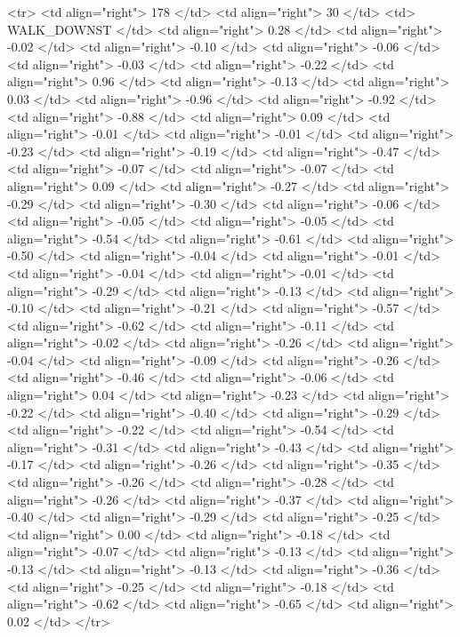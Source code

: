   <tr> <td align="right"> 178 </td> <td align="right">  30 </td> <td> WALK_DOWNST </td> <td align="right"> 0.28 </td> <td align="right"> -0.02 </td> <td align="right"> -0.10 </td> <td align="right"> -0.06 </td> <td align="right"> -0.03 </td> <td align="right"> -0.22 </td> <td align="right"> 0.96 </td> <td align="right"> -0.13 </td> <td align="right"> 0.03 </td> <td align="right"> -0.96 </td> <td align="right"> -0.92 </td> <td align="right"> -0.88 </td> <td align="right"> 0.09 </td> <td align="right"> -0.01 </td> <td align="right"> -0.01 </td> <td align="right"> -0.23 </td> <td align="right"> -0.19 </td> <td align="right"> -0.47 </td> <td align="right"> -0.07 </td> <td align="right"> -0.07 </td> <td align="right"> 0.09 </td> <td align="right"> -0.27 </td> <td align="right"> -0.29 </td> <td align="right"> -0.30 </td> <td align="right"> -0.06 </td> <td align="right"> -0.05 </td> <td align="right"> -0.05 </td> <td align="right"> -0.54 </td> <td align="right"> -0.61 </td> <td align="right"> -0.50 </td> <td align="right"> -0.04 </td> <td align="right"> -0.01 </td> <td align="right"> -0.04 </td> <td align="right"> -0.01 </td> <td align="right"> -0.29 </td> <td align="right"> -0.13 </td> <td align="right"> -0.10 </td> <td align="right"> -0.21 </td> <td align="right"> -0.57 </td> <td align="right"> -0.62 </td> <td align="right"> -0.11 </td> <td align="right"> -0.02 </td> <td align="right"> -0.26 </td> <td align="right"> -0.04 </td> <td align="right"> -0.09 </td> <td align="right"> -0.26 </td> <td align="right"> -0.46 </td> <td align="right"> -0.06 </td> <td align="right"> 0.04 </td> <td align="right"> -0.23 </td> <td align="right"> -0.22 </td> <td align="right"> -0.40 </td> <td align="right"> -0.29 </td> <td align="right"> -0.22 </td> <td align="right"> -0.54 </td> <td align="right"> -0.31 </td> <td align="right"> -0.43 </td> <td align="right"> -0.17 </td> <td align="right"> -0.26 </td> <td align="right"> -0.35 </td> <td align="right"> -0.26 </td> <td align="right"> -0.28 </td> <td align="right"> -0.26 </td> <td align="right"> -0.37 </td> <td align="right"> -0.40 </td> <td align="right"> -0.29 </td> <td align="right"> -0.25 </td> <td align="right"> 0.00 </td> <td align="right"> -0.18 </td> <td align="right"> -0.07 </td> <td align="right"> -0.13 </td> <td align="right"> -0.13 </td> <td align="right"> -0.13 </td> <td align="right"> -0.36 </td> <td align="right"> -0.25 </td> <td align="right"> -0.18 </td> <td align="right"> -0.62 </td> <td align="right"> -0.65 </td> <td align="right"> 0.02 </td> </tr>
